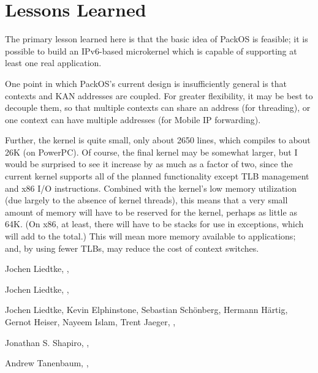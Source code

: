 \documentclass{article}
\begin{document}
\section{Lessons Learned}

The primary lesson learned here is that the basic idea of PackOS is
feasible; it is possible to build an IPv6-based microkernel which is
capable of supporting at least one real application.

One point in which PackOS's current design is insufficiently general
is that contexts and KAN addresses are coupled.  For greater
flexibility, it may be best to decouple them, so that multiple
contexts can share an address (for threading), or one context can have
multiple addresses (for Mobile IP forwarding).

Further, the kernel is quite small, only about 2650 lines, which
compiles to about 26K (on PowerPC).  Of course, the final kernel may
be somewhat larger, but I would be surprised to see it increase by as
much as a factor of two, since the current kernel supports all of the
planned functionality except TLB management and x86 I/O instructions.
Combined with the kernel's low memory utilization (due largely to the
absence of kernel threads), this means that a very small amount of
memory will have to be reserved for the kernel, perhaps as little as
64K.  (On x86, at least, there will have to be stacks for use in
exceptions, which will add to the total.) This will mean more memory
available to applications; and, by using fewer TLBs, may reduce the
cost of context switches.

\begin{thebibliography}{10}
Jochen Liedtke,
,

Jochen Liedtke,
,

Jochen Liedtke, Kevin Elphinstone, Sebastian Sch\"onberg, Hermann
H\"artig, Gernot Heiser, Nayeem Islam, Trent Jaeger,
,

Jonathan S. Shapiro,
,

Andrew Tanenbaum,
,

\end{thebibliography}
\end{document}

